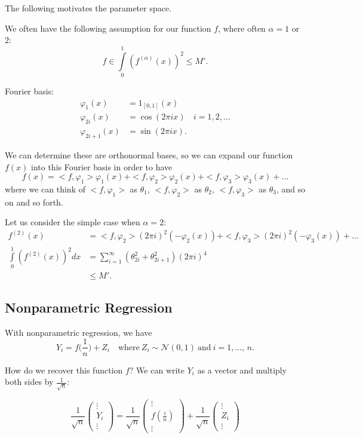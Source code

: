 \documentclass[twoside]{article}
\theoremstyle{definition}
\theoremstyle{definition}
\theoremstyle{remark}
\def\Y{{\mathcal Y}}
\begin{document}
The following motivates the parameter space.

We often have the following assumption for our function $f$, where often $\alpha=1$ or $2$:
\[
f \in \int \limits_0^1 (f^{(\alpha)} (x))^2 \leq M'.
\]

Fourier basis:
\[
\begin{aligned}
\varphi_1(x) &= 1_{[0,1]}(x) \\
\varphi_{2i}(x) &= \cos(2 \pi ix) & i=1, 2, \ldots \\
\varphi_{2i+1} (x) &= \sin(2 \pi ix).
\end{aligned}
\]

We can determine these are orthonormal bases, so we can expand our function $f(x)$ into this Fourier basis in order to have
\[
f(x) = <f, \varphi_1> \varphi_1(x) + <f, \varphi_2> \varphi_2(x) + <f, \varphi_3> \varphi_3(x) + \ldots
\]
where we can think of $<f, \varphi_1>$ as $\theta_1$, $<f ,\varphi_2>$ as $\theta_2$, $<f, \varphi_3>$ as $\theta_3$, and so on and so forth.

Let us consider the simple case when $\alpha=2$:
\[
\begin{aligned}
f^{(2)}(x) &= <f, \varphi_2> (2\pi i)^2 (-\varphi_2(x)) + <f, \varphi_3> (2\pi i)^2 (-\varphi_3(x)) + \ldots \\
\int \limits_0^1 (f^{(2)}(x))^2 dx &= \sum \limits_{i=1}^\infty (\theta_{2i}^2 + \theta_{2i+1}^2) (2\pi i)^4 \\
&\leq M'.
\end{aligned}
\]

\subsection{Nonparametric Regression}

With nonparametric regression, we have
\[
Y_i = f \bigg( \frac{1}{n} \bigg) + Z_i \quad \text{where} \ Z_i \sim \mathcal{N}(0, 1) \ \text{and} \ i=1, \ldots, \, n.
\]

How do we recover this function $f$? We can write $Y_i$ as a vector and multiply both sides by $\frac{1}{\sqrt{n}}:$

\[
\frac{1}{\sqrt{n}} \left(\begin{smallmatrix} \vdots \\Y_i \\ \vdots \end{smallmatrix}\right) = \frac{1}{\sqrt{n}} \left(\begin{smallmatrix} \vdots \\ f(\frac{i}{n}) \\ \vdots \end{smallmatrix}\right) + \frac{1}{\sqrt{n}} \left(\begin{smallmatrix} \vdots \\Z_i \\ \vdots \end{smallmatrix}\right)
\]
\end{document}
